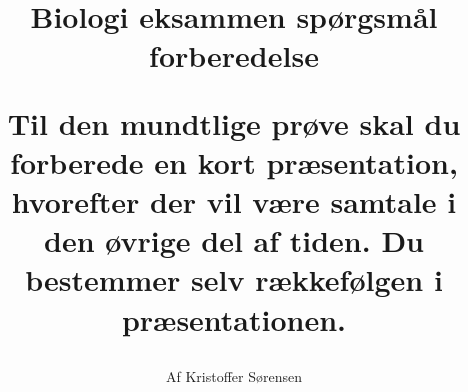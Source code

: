 \title{
    Biologi eksammen spørgsmål forberedelse \\ 
    \begin{small}
        Til den mundtlige prøve skal du forberede en kort præsentation, hvorefter der vil være samtale i den øvrige del af tiden. Du bestemmer selv rækkefølgen i præsentationen.
    \end{small}
}

\author{Af Kristoffer Sørensen}
\maketitle


\thispagestyle{empty}
\newpage
\tableofcontents
\newpage
